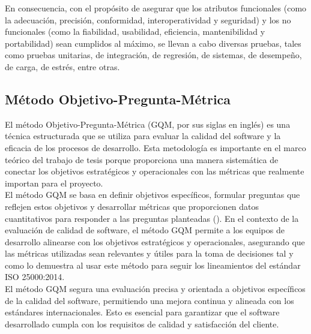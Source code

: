 En consecuencia, con el propósito de asegurar que los atributos funcionales (como la adecuación, precisión, conformidad, interoperatividad y seguridad) y los no funcionales (como la fiabilidad, usabilidad, eficiencia, mantenibilidad y portabilidad) sean cumplidos al máximo, se llevan a cabo diversas pruebas, tales como pruebas unitarias, de integración, de regresión, de sistemas, de desempeño, de carga, de estrés, entre otras.

\subsection{Método Objetivo-Pregunta-Métrica}
El método Objetivo-Pregunta-Métrica (GQM, por sus siglas en inglés) es una técnica estructurada que se utiliza para evaluar la calidad del software y la eficacia de los procesos de desarrollo. Esta metodología es importante en el marco teórico del trabajo de tesis porque proporciona una manera sistemática de conectar los objetivos estratégicos y operacionales con las métricas que realmente importan para el proyecto.\\ \indent
El método GQM se basa en definir objetivos específicos, formular preguntas que reflejen estos objetivos y desarrollar métricas que proporcionen datos cuantitativos para responder a las preguntas planteadas (\cite{van1999goal}). En el contexto de la evaluación de calidad de software, el método GQM permite a los equipos de desarrollo alinearse con los objetivos estratégicos y operacionales, asegurando que las métricas utilizadas sean relevantes y útiles para la toma de decisiones tal y como lo demuestra \textcite{lavadenzplataforma} al usar este método para seguir los lineamientos del estándar ISO 25000:2014.\\ \indent
El método GQM segura una evaluación precisa y orientada a objetivos específicos de la calidad del software, permitiendo una mejora continua y alineada con los estándares internacionales. Esto es esencial para garantizar que el software desarrollado cumpla con los requisitos de calidad y satisfacción del cliente.

